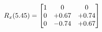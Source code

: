 \documentclass[preview]{standalone}
\begin{document}
\begin{align*}
\special{dvisvgm:raw <g id='unique000'>}R_{x}(5.45) = \begin{bmatrix}1 & 0 & 0 \\0 & +0.67 & +0.74 \\0 & -0.74 & +0.67\end{bmatrix}\special{dvisvgm:raw </g>}
\end{align*}
\end{document}
